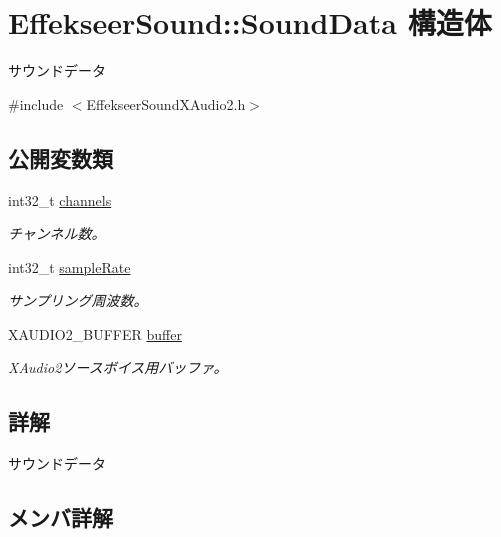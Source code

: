 \hypertarget{struct_effekseer_sound_1_1_sound_data}{}\section{Effekseer\+Sound\+:\+:Sound\+Data 構造体}
\label{struct_effekseer_sound_1_1_sound_data}


サウンドデータ  




{\ttfamily \#include $<$Effekseer\+Sound\+X\+Audio2.\+h$>$}

\subsection*{公開変数類}
\begin{DoxyCompactItemize}
\item 
int32\+\_\+t \mbox{\hyperlink{struct_effekseer_sound_1_1_sound_data_a6ce06a2fb5016cc2664b525ace949423}{channels}}
\begin{DoxyCompactList}\small\item\em チャンネル数。 \end{DoxyCompactList}\item 
int32\+\_\+t \mbox{\hyperlink{struct_effekseer_sound_1_1_sound_data_a32d83df2626bbfbeafa1f6ebe72d9516}{sample\+Rate}}
\begin{DoxyCompactList}\small\item\em サンプリング周波数。 \end{DoxyCompactList}\item 
X\+A\+U\+D\+I\+O2\+\_\+\+B\+U\+F\+F\+ER \mbox{\hyperlink{struct_effekseer_sound_1_1_sound_data_ac63c1bb266d48dcb88facd2dbb1b15cb}{buffer}}
\begin{DoxyCompactList}\small\item\em X\+Audio2ソースボイス用バッファ。 \end{DoxyCompactList}\end{DoxyCompactItemize}


\subsection{詳解}
サウンドデータ 

\subsection{メンバ詳解}
\mbox{\label{struct_effekseer_sound_1_1_sound_data_ac63c1bb266d48dcb88facd2dbb1b15cb}} 
